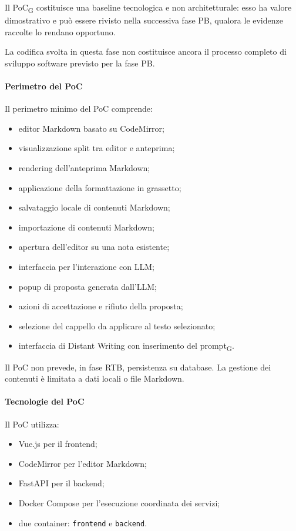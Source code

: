 Il PoC\textsubscript{G} costituisce una baseline tecnologica e non architetturale: esso ha valore
dimostrativo e può essere rivisto nella successiva fase PB, qualora le
evidenze raccolte lo rendano opportuno.

La codifica svolta in questa fase non costituisce ancora il processo completo di
sviluppo software previsto per la fase PB.

\paragraph{Perimetro del PoC}

Il perimetro minimo del PoC comprende:

\begin{itemize}
    \item editor Markdown basato su CodeMirror;
    \item visualizzazione split tra editor e anteprima;
    \item rendering dell'anteprima Markdown;
    \item applicazione della formattazione in grassetto;
    \item salvataggio locale di contenuti Markdown;
    \item importazione di contenuti Markdown;
    \item apertura dell'editor su una nota esistente;
    \item interfaccia per l'interazione con LLM;
    \item popup di proposta generata dall'LLM;
    \item azioni di accettazione e rifiuto della proposta;
    \item selezione del cappello da applicare al testo selezionato;
    \item interfaccia di Distant Writing con inserimento del prompt\textsubscript{G}.
\end{itemize}

Il PoC non prevede, in fase RTB, persistenza su database. La gestione dei
contenuti è limitata a dati locali o file Markdown.

\paragraph{Tecnologie del PoC}

Il PoC utilizza:

\begin{itemize}
    \item Vue.js per il frontend;
    \item CodeMirror per l'editor Markdown;
    \item FastAPI per il backend;
    \item Docker Compose per l'esecuzione coordinata dei servizi;
    \item due container: \texttt{frontend} e \texttt{backend}.
\end{itemize}

